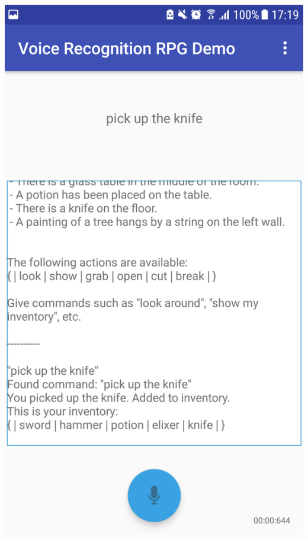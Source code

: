 \documentclass[11pt]{article}
\begin{document}
\begin{appendices}
\begin{center}
\includegraphics[scale=0.18]{overworld-1.png}

\end{center}
\end{appendices}
\end{document}

